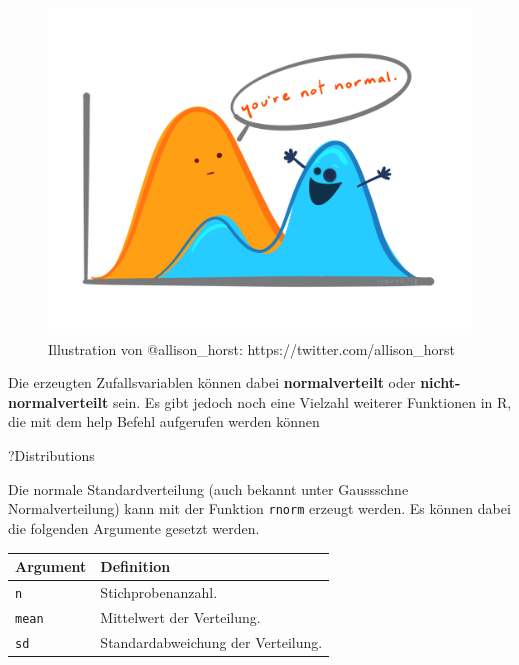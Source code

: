 \documentclass[
]{article}
\newenvironment{Shaded}{\begin{snugshade}}{\end{snugshade}}
\newcommand{\NormalTok}[1]{#1}
\begin{document}
\begin{figure}

{\centering \includegraphics[width=32.22in]{images/017} 

}

\caption{Illustration von @allison_horst: https://twitter.com/allison_horst}\label{fig:unnamed-chunk-72}
\end{figure}

Die erzeugten Zufallsvariablen können dabei \textbf{normalverteilt} oder \textbf{nicht-normalverteilt} sein. Es gibt jedoch noch eine Vielzahl weiterer Funktionen in R, die mit dem help Befehl aufgerufen werden können

\begin{Shaded}
\begin{Highlighting}[]
\NormalTok{?Distributions}
\end{Highlighting}
\end{Shaded}

Die normale Standardverteilung (auch bekannt unter Gaussschne Normalverteilung) kann mit der Funktion \texttt{rnorm} erzeugt werden. Es können dabei die folgenden Argumente gesetzt werden.

\begin{longtable}[]{@{}ll@{}}
\toprule
Argument & Definition \\
\midrule
\endhead
\texttt{n} & Stichprobenanzahl. \\
\texttt{mean} & Mittelwert der Verteilung. \\
\texttt{sd} & Standardabweichung der Verteilung. \\
\bottomrule
\end{longtable}
\end{document}

